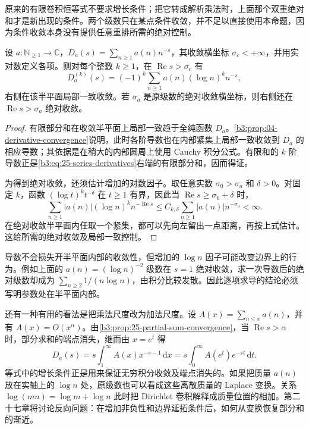 原来的有限卷积恒等式不要求增长条件；把它转成解析乘法时，上面那个双重绝对和才是新出现的条件。两个级数只在某点条件收敛，并不足以直接使用本命题，因为条件收敛本身没有提供任意重排所需的绝对控制。

\begin{proposition}[逐项求导]\label{b3:prop:25-series-derivatives}
设 \(a:\mathbb N_{\ge1}\to\mathbb C\)，\(D_a(s)=\sum_{n\ge1}a(n)n^{-s}\)，其收敛横坐标 \(\sigma_c<+\infty\)，并用实对数定义各项。则对每个整数 \(k\ge1\)，在 \(\operatorname{Re}s>\sigma_c\) 有
\begin{equation}\label{b3:eq:25-series-derivatives}
 D_a^{(k)}(s)=(-1)^k\sum_{n\ge1}a(n)(\log n)^k n^{-s},
\end{equation}
右侧在该半平面局部一致收敛。若 \(\sigma_a\) 是原级数的绝对收敛横坐标，则右侧还在 \(\operatorname{Re}s>\sigma_a\) 绝对收敛。
\end{proposition}
\begin{proof}
有限部分和在收敛半平面上局部一致趋于全纯函数 \(D_a\)。\cref{b3:prop:04-derivative-convergence}说明，此时各阶导数也在内部紧集上局部一致收敛到 \(D_a\) 的相应导数；其依据是在稍大的内部圆周上使用 Cauchy 积分公式。有限和的 \(k\) 阶导数正是\eqref{b3:eq:25-series-derivatives}右端的有限部分和，因而得证。

为得到绝对收敛，还须估计增加的对数因子。取任意实数 \(\sigma_0>\sigma_a\) 和 \(\delta>0\)。对固定 \(k\)，函数 \((\log t)^kt^{-\delta}\) 在 \(t\ge1\) 有界，因此当 \(\operatorname{Re}s\ge\sigma_0+\delta\) 时，
\[
 \sum_{n\ge1}|a(n)|(\log n)^k n^{-\operatorname{Re}s}
 \le C_{k,\delta}\sum_{n\ge1}|a(n)|n^{-\sigma_0}<\infty.
\]
在绝对收敛半平面内任取一个紧集，都可以先向左留出一点距离，再按上式估计。这给所需的绝对收敛及局部一致控制。
\end{proof}

导数不会损失开半平面内部的收敛性，但增加的 \(\log n\) 因子可能改变边界上的行为。例如上面的 \(a(n)=(\log n)^{-2}\) 级数在 \(s=1\) 绝对收敛，求一次导数后的绝对级数却成为 \(\sum_{n\ge2}1/(n\log n)\)，由积分比较发散。因此逐项求导的结论必须写明参数处在半平面内部。

还有一种有用的看法是把乘法尺度改为加法尺度。设 \(A(x)=\sum_{n\le x}a(n)\)，并有 \(A(x)=O(x^{\alpha})\)。由\cref{b3:prop:25-partial-sum-convergence}，当 \(\operatorname{Re}s>\alpha\) 时，部分求和的端点消失，继而由 \(x=e^t\) 得
\[
 D_a(s)=s\int_1^{\infty}A(x)x^{-s-1}\,\mathrm dx
       =s\int_0^{\infty}A(e^t)e^{-st}\,\mathrm dt.
\]
等式中的增长条件正是用来保证无穷积分收敛及端点消失的。如果把质量 \(a(n)\) 放在实轴上的 \(\log n\) 处，原级数也可以看成这些离散质量的 Laplace 变换。关系 \(\log(mn)=\log m+\log n\) 此时把 Dirichlet 卷积解释成质量位置的相加。第二十七章将讨论反向问题：在增加非负性和边界延拓条件后，如何从变换恢复部分和的渐近。

